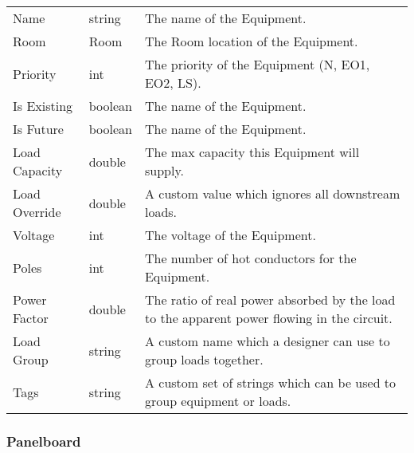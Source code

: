 \documentclass[letterpaper,10pt,english]{sphinxmanual}
\begin{document}
\begin{savenotes}\sphinxattablestart
\centering
\begin{tabulary}{\linewidth}[t]{|T|T|T|}
\hline
\sphinxstyletheadfamily 
{}
&\sphinxstyletheadfamily 
{}
&\sphinxstyletheadfamily 
{}
\\
\hline
Name
&
string
&
The name of the Equipment.
\\
\hline
Room
&
Room
&
The Room location of the Equipment.
\\
\hline
Priority
&
int
&
The priority of the Equipment (N, EO1, EO2, LS).
\\
\hline
Is Existing
&
boolean
&
The name of the Equipment.
\\
\hline
Is Future
&
boolean
&
The name of the Equipment.
\\
\hline
Load Capacity
&
double
&
The max capacity this Equipment will supply.
\\
\hline
Load Override
&
double
&
A custom value which ignores all downstream loads.
\\
\hline
Voltage
&
int
&
The voltage of the Equipment.
\\
\hline
Poles
&
int
&
The number of hot conductors for the Equipment.
\\
\hline
Power Factor
&
double
&
The ratio of real power absorbed by the load to the apparent power flowing in the circuit.
\\
\hline
Load Group
&
string
&
A custom name which a designer can use to group loads together.
\\
\hline
Tags
&
string
&
A custom set of strings which can be used to group equipment or loads.
\\
\hline
\end{tabulary}
\par
\sphinxattableend\end{savenotes}


\subsubsection{Panelboard}
\label{\detokenize{docs/definitions/index-definitions:panelboard-definition}}\label{\detokenize{docs/definitions/index-definitions:id10}}
\end{document}
